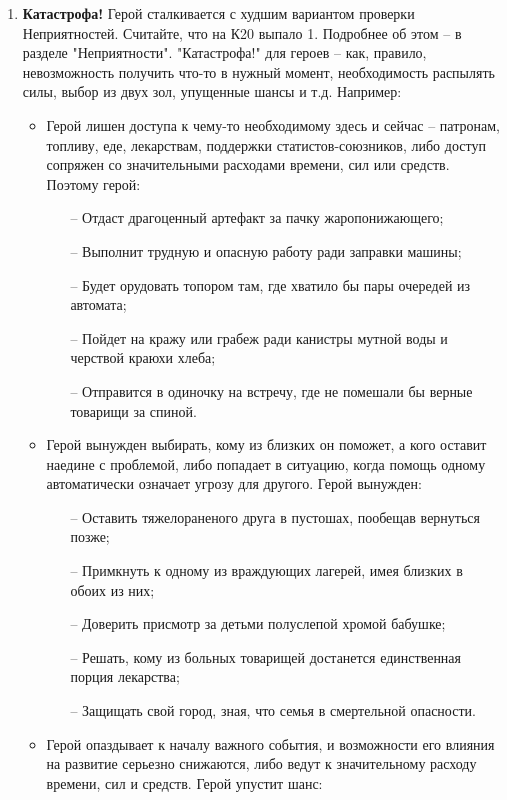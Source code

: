 \begin{enumerate}
    \item \textbf{Катастрофа!}
    \newline Герой сталкивается с худшим вариантом проверки Неприятностей. Считайте, что на К20 выпало 1. Подробнее об этом – в разделе "Неприятности".
    \newline "Катастрофа!" для героев – как, правило, невозможность получить что-то в нужный момент, необходимость распылять силы, выбор из двух зол, упущенные шансы и т.д. Например:
    \begin{itemize}
        \item Герой лишен доступа к чему-то необходимому здесь и сейчас – патронам, топливу, еде, лекарствам, поддержки статистов-союзников, либо доступ сопряжен со значительными расходами времени, сил или средств. Поэтому герой:
        \begin{itemize}
	        \item[--] Отдаст драгоценный артефакт за пачку жаропонижающего;
	        \item[--] Выполнит трудную и опасную работу ради заправки машины;
	        \item[--] Будет орудовать топором там, где хватило бы пары очередей из автомата;
	        \item[--] Пойдет на кражу или грабеж ради канистры мутной воды и черствой краюхи хлеба;
	        \item[--] Отправится в одиночку на встречу, где не помешали бы верные товарищи за спиной.
        \end{itemize}
        \item Герой вынужден выбирать, кому из близких он поможет, а кого оставит наедине с проблемой, либо попадает в ситуацию, когда помощь одному автоматически означает угрозу для другого. Герой вынужден:
        \begin{itemize}
	        \item[--] Оставить тяжелораненого друга в пустошах, пообещав вернуться позже;
	        \item[--] Примкнуть к одному из враждующих лагерей, имея близких в обоих из них;
	        \item[--] Доверить присмотр за детьми полуслепой хромой бабушке;
	        \item[--] Решать, кому из больных товарищей достанется единственная порция лекарства;
	        \item[--] Защищать свой город, зная, что семья в смертельной опасности.
        \end{itemize}
        \item Герой опаздывает к началу важного события, и возможности его влияния на развитие серьезно снижаются, либо ведут к значительному расходу времени, сил и средств. Герой упустит шанс:

\end{itemize}
\end{enumerate}
